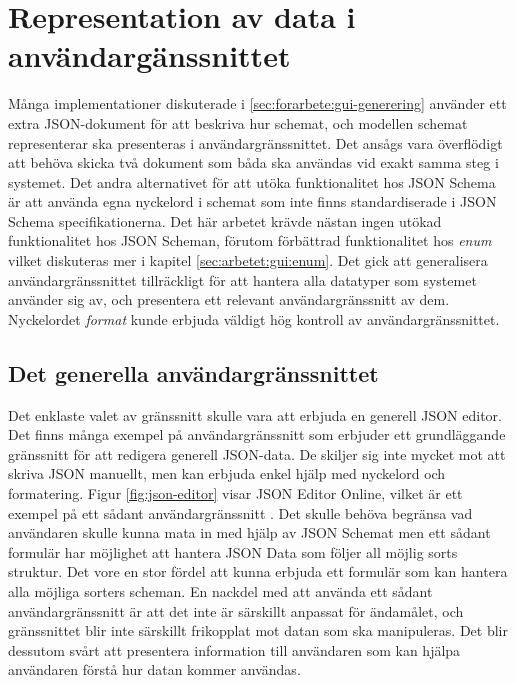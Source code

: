 \section{Representation av data i användargänssnittet}
\label{sec:arbetet:gui}

Många implementationer diskuterade i \ref{sec:forarbete:gui-generering} använder ett extra JSON-dokument för att beskriva hur schemat, och modellen schemat representerar ska presenteras i användargränssnittet. Det ansågs vara överflödigt att behöva skicka två dokument som båda ska användas vid exakt samma steg i systemet. Det andra alternativet för att utöka funktionalitet hos JSON Schema är att använda egna nyckelord i schemat som inte finns standardiserade i JSON Schema specifikationerna. Det här arbetet krävde nästan ingen utökad funktionalitet hos JSON Scheman, förutom förbättrad funktionalitet hos \textit{enum} vilket diskuteras mer i kapitel \ref{sec:arbetet:gui:enum}. Det gick att generalisera användargränssnittet tillräckligt för att hantera alla datatyper som systemet använder sig av, och presentera ett relevant användargränssnitt av dem. Nyckelordet \textit{format} kunde erbjuda väldigt hög kontroll av användargränssnittet.

\subsection{Det generella användargränssnittet}

Det enklaste valet av gränssnitt skulle vara att erbjuda en generell JSON editor. Det finns många exempel på användargränssnitt som erbjuder ett grundläggande gränssnitt för att redigera generell JSON-data. De skiljer sig inte mycket mot att skriva JSON manuellt, men kan erbjuda enkel hjälp med nyckelord och formatering. Figur \ref{fig:json-editor} visar JSON Editor Online, vilket är ett exempel på ett sådant användargränssnitt \cite{DeJong2018}. Det skulle behöva begränsa vad användaren skulle kunna mata in med hjälp av JSON Schemat men ett sådant formulär har möjlighet att hantera JSON Data som följer all möjlig sorts struktur. Det vore en stor fördel att kunna erbjuda ett formulär som kan hantera alla möjliga sorters scheman. En nackdel med att använda ett sådant användargränssnitt är att det inte är särskillt anpassat för ändamålet, och gränssnittet blir inte särskillt frikopplat mot datan som ska manipuleras. Det blir dessutom svårt att presentera information till användaren som kan hjälpa användaren förstå hur datan kommer användas.

